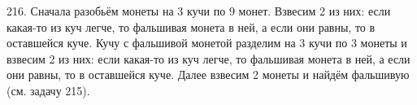 216. Сначала разобьём монеты на 3 кучи по 9 монет. Взвесим 2 из них: если какая-то из куч легче, то фальшивая монета в ней, а если они равны, то в оставшейся куче. Кучу с фальшивой монетой разделим на 3 кучи по 3 монеты и взвесим 2 из них:  если какая-то из куч легче, то фальшивая монета в ней, а если они равны, то в оставшейся куче. Далее взвесим 2 монеты и найдём фальшивую (см. задачу 215).\\
